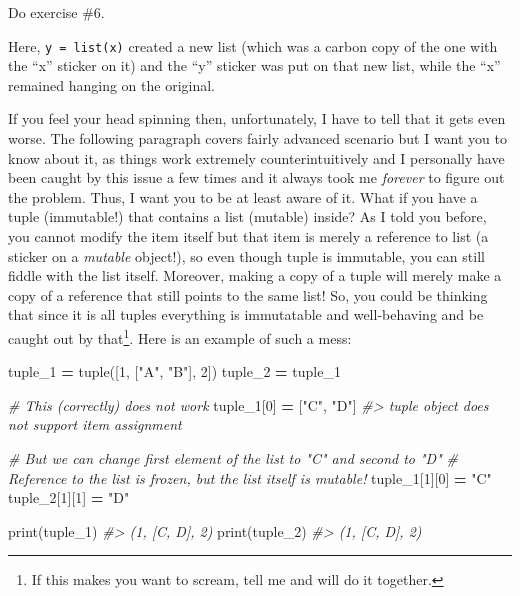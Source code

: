 \documentclass[
]{book}
\newenvironment{Shaded}{\begin{snugshade}}{\end{snugshade}}
\newcommand{\BuiltInTok}[1]{#1}
\newcommand{\CommentTok}[1]{\textcolor[rgb]{0.56,0.35,0.01}{\textit{#1}}}
\newcommand{\DecValTok}[1]{\textcolor[rgb]{0.00,0.00,0.81}{#1}}
\newcommand{\NormalTok}[1]{#1}
\newcommand{\OperatorTok}[1]{\textcolor[rgb]{0.81,0.36,0.00}{\textbf{#1}}}
\newcommand{\StringTok}[1]{\textcolor[rgb]{0.31,0.60,0.02}{#1}}
\begin{document}
Do exercise \#6.

Here, \texttt{y\ =\ list(x)} created a new list (which was a carbon copy of the one with the ``x'' sticker on it) and the ``y'' sticker was put on that new list, while the ``x'' remained hanging on the original.

If you feel your head spinning then, unfortunately, I have to tell that it gets even worse. The following paragraph covers fairly advanced scenario but I want you to know about it, as things work extremely counterintuitively and I personally have been caught by this issue a few times and it always took me \emph{forever} to figure out the problem. Thus, I want you to be at least aware of it. What if you have a tuple (immutable!) that contains a list (mutable) inside? As I told you before, you cannot modify the item itself but that item is merely a reference to list (a sticker on a \emph{mutable} object!), so even though tuple is immutable, you can still fiddle with the list itself. Moreover, making a copy of a tuple will merely make a copy of a reference that still points to the same list! So, you could be thinking that since it is all tuples everything is immutatable and well-behaving and be caught out by that\footnote{If this makes you want to scream, tell me and will do it together.}. Here is an example of such a mess:

\begin{Shaded}
\begin{Highlighting}[]
\NormalTok{tuple\_1 }\OperatorTok{=} \BuiltInTok{tuple}\NormalTok{([}\DecValTok{1}\NormalTok{, [}\StringTok{"A"}\NormalTok{, }\StringTok{"B"}\NormalTok{], }\DecValTok{2}\NormalTok{])}
\NormalTok{tuple\_2 }\OperatorTok{=}\NormalTok{ tuple\_1}

\CommentTok{\# This (correctly) does not work}
\NormalTok{tuple\_1[}\DecValTok{0}\NormalTok{] }\OperatorTok{=}\NormalTok{ [}\StringTok{"C"}\NormalTok{, }\StringTok{"D"}\NormalTok{]}
\CommentTok{\#\textgreater{} \textquotesingle{}tuple\textquotesingle{} object does not support item assignment}

\CommentTok{\# But we can change first element of the list to "C" and second to "D"}
\CommentTok{\# Reference to the list is frozen, but the list itself is mutable!}
\NormalTok{tuple\_1[}\DecValTok{1}\NormalTok{][}\DecValTok{0}\NormalTok{] }\OperatorTok{=} \StringTok{"C"}
\NormalTok{tuple\_2[}\DecValTok{1}\NormalTok{][}\DecValTok{1}\NormalTok{] }\OperatorTok{=} \StringTok{"D"}

\BuiltInTok{print}\NormalTok{(tuple\_1)}
\CommentTok{\#\textgreater{} (1, [\textquotesingle{}C\textquotesingle{}, \textquotesingle{}D\textquotesingle{}], 2)}
\BuiltInTok{print}\NormalTok{(tuple\_2)}
\CommentTok{\#\textgreater{} (1, [\textquotesingle{}C\textquotesingle{}, \textquotesingle{}D\textquotesingle{}], 2)}
\end{Highlighting}
\end{Shaded}
\end{document}
